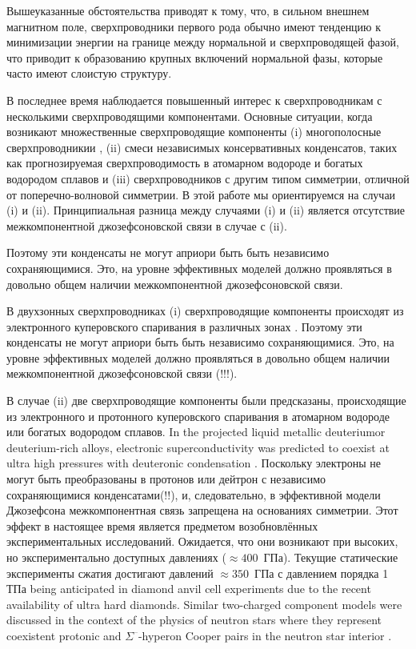 Вышеуказанные обстоятельства приводят к тому, что, в сильном внешнем магнитном 
поле, сверхпроводники первого рода обычно имеют тенденцию к минимизации 
энергии на границе между нормальной и сверхпроводящей фазой, что приводит к 
образованию крупных включений нормальной фазы, которые часто имеют слоистую 
структуру\cite{bib:4}. 

В последнее время наблюдается повышенный интерес к сверхпроводникам с 
несколькими сверхпроводящими компонентами. Основные ситуации, когда возникают 
множественные сверхпроводящие компоненты (i) многополосные сверхпроводникии
\cite{bib:6,bib:7,bib:8,bib:9,bib:10,bib:11}, (ii) смеси независимых 
консервативных конденсатов, таких как прогнозируемая сверхпроводимость в 
атомарном водороде и богатых водородом сплавов \cite{bib:12,bib:13,bib:14} и 
(iii) сверхпроводников с другим типом симметрии, отличной от 
поперечно-волновой симметрии. В этой работе мы ориентируемся на случаи (i) и 
(ii). Принципиальная разница между случаями (i) и (ii) является отсутствие 
межкомпонентной джозефсоновской связи в случае с (ii).

Поэтому эти конденсаты не могут априори быть быть независимо сохраняющимися.
Это, на уровне эффективных моделей должно проявляться в довольно общем наличии 
межкомпонентной джозефсоновской связи.

В двухзонных сверхпроводниках (i) сверхпроводящие компоненты происходят из
электронного куперовского спаривания в различных зонах \cite{bib:6}. Поэтому 
эти конденсаты не могут априори быть быть независимо сохраняющимися. Это, на 
уровне эффективных моделей должно проявляться в довольно общем наличии 
межкомпонентной джозефсоновской связи (!!!).

В случае (ii) две сверхпроводящие компоненты были предсказаны, происходящие 
из электронного и протонного куперовского спаривания в атомарном водороде 
или богатых водородом сплавов. In the projected liquid metallic deuteriumor 
deuterium-rich alloys, electronic superconductivity was predicted to coexist 
at ultra high pressures with deuteronic condensation 
\cite{bib:12,bib:13,bib:14}. Поскольку электроны не могут быть преобразованы в 
протонов или дейтрон с независимо сохраняющимися конденсатами(!!), и, 
следовательно, в эффективной модели Джозефсона межкомпонентная связь запрещена 
на основаниях симметрии. Этот эффект в настоящее время является предметом 
возобновлённых экспериментальных исследований. Ожидается, что они возникают 
при высоких, но экспериментально доступных давлениях (\( \approx 400 \)~ГПа). 
Текущие статические эксперименты сжатия достигают давлений 
\( \approx 350 \)~ГПа с давлением порядка 1 ТПа being anticipated in diamond 
anvil cell experiments due to the recent availability of ultra hard diamonds. 
Similar two-charged component models were discussed in the context of the 
physics of neutron stars where they represent coexistent protonic and 
\( \Sigma^\text{--} \)-hyperon Cooper pairs in the neutron star interior
\cite{bib:15}. 

